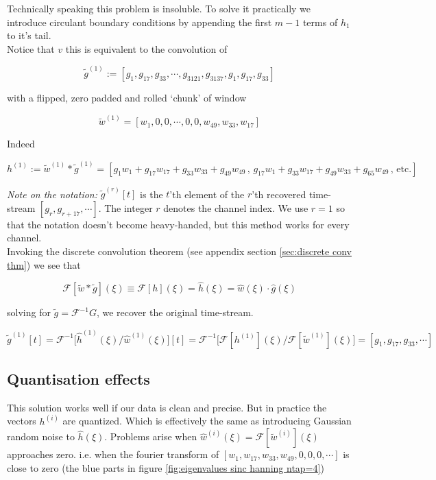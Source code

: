 \documentclass[12pt]{article}
\begin{document}
Technically speaking this problem is insoluble. To solve it practically we introduce circulant boundary conditions by appending the first $m-1$ terms of $h_1$ to it's tail. \\

Notice that $v$ this is equivalent to the convolution of

$$\widetilde g^{(1)}:= [g_1,g_{17},g_{33},\cdots,g_{3121},g_{3137},g_1,g_{17},g_{33}]$$

with a flipped, zero padded and rolled `chunk' of window 

$$\widetilde w^{(1)} = [w_1,0,0,\cdots,0,0,w_{49},w_{33},w_{17}]$$ 

Indeed

$$h^{(1)} := \widetilde w^{(1)}\ast \widetilde g^{(1)} = [g_1w_1+g_{17}w_{17}+g_{33}w_{33}+g_{49}w_{49} \,,\, g_{17}w_1+g_{33}w_{17}+g_{49}w_{33}+g_{65}w_{49}\,,\,\text{etc.}]$$

\textit{Note on the notation:} $\widetilde g^{(r)}[t]$ is the $t$'th element of the $r$'th recovered time-stream $[g_r,g_{r+17},\cdots]$. The integer $r$ denotes the channel index. We use $r=1$ so that the notation doesn't become heavy-handed, but this method works for every channel. \\   

Invoking the discrete convolution theorem (see appendix section \ref{sec:discrete conv thm}) we see that

$$\mathcal F[\widetilde w \ast \widetilde g](\xi) \equiv \mathcal F [h](\xi) = \widehat h(\xi) = \widehat w(\xi)\cdot \widehat g(\xi)$$

solving for $\widetilde g = \mathcal F^{-1} G$, we recover the original time-stream.

\begin{equation}\label{eq:reconstructed signal}
\widetilde g^{(1)}[t] = \mathcal F^{-1}\Big[ \widehat h^{(1)}(\xi) / \widehat w^{(1)}(\xi)\Big][t] = \mathcal F^{-1} \Big[\mathcal F[h^{(1)}](\xi) / \mathcal F[\widetilde w^{(1)}](\xi) \Big] = [g_1,g_{17},g_{33},\cdots]
\end{equation}


\subsection{Quantisation effects}

This solution works well if our data is clean and precise. But in practice the vectors $h^{(i)}$ are quantized. Which is effectively the same as introducing Gaussian random noise to $\widehat h(\xi)$. Problems arise when $\widehat w^{(i)}(\xi) = \mathcal F [\widetilde w^{(i)}](\xi)$ approaches zero. i.e. when the fourier transform of $[w_1,w_{17},w_{33},w_{49},0,0,0,\cdots]$ is close to zero (the blue parts in figure \ref{fig:eigenvalues sinc hanning ntap=4}) 
\end{document}
